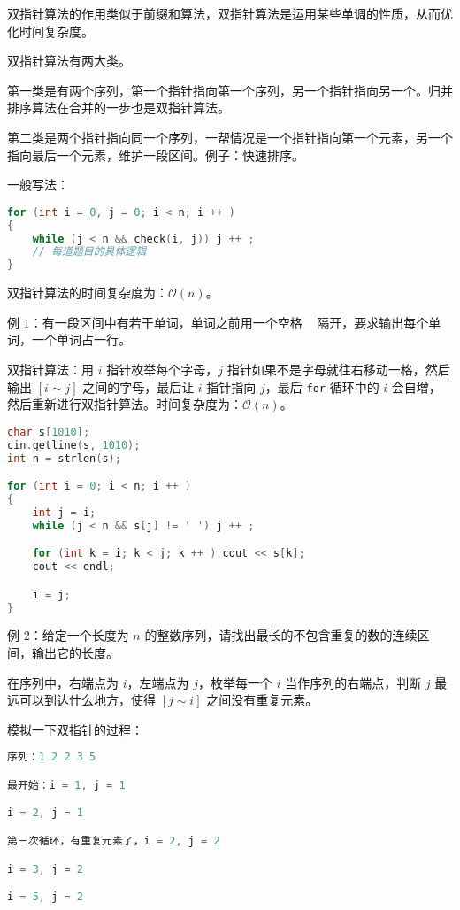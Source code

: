 
双指针算法的作用类似于前缀和算法，双指针算法是运用某些单调的性质，从而优化时间复杂度。

双指针算法有两大类。

第一类是有两个序列，第一个指针指向第一个序列，另一个指针指向另一个。归并排序算法在合并的一步也是双指针算法。

第二类是两个指针指向同一个序列，一帮情况是一个指针指向第一个元素，另一个指向最后一个元素，维护一段区间。例子：快速排序。

一般写法：

\begin{lstlisting}[language=cpp]
for (int i = 0, j = 0; i < n; i ++ )
{
    while (j < n && check(i, j)) j ++ ;
    // 每道题目的具体逻辑
}
\end{lstlisting}

双指针算法的时间复杂度为：$\mathcal{O}(n)$。

例 $1$：有一段区间中有若干单词，单词之前用一个空格 \verb| | 隔开，要求输出每个单词，一个单词占一行。

双指针算法：用 $i$ 指针枚举每个字母，$j$ 指针如果不是字母就往右移动一格，然后输出 $[i \sim j]$ 之间的字母，最后让 $i$ 指针指向 $j$，最后 \verb|for| 循环中的 $i$ 会自增，然后重新进行双指针算法。时间复杂度为：$\mathcal{O}(n)$。

\begin{lstlisting}[language=cpp]
char s[1010];
cin.getline(s, 1010);
int n = strlen(s);

for (int i = 0; i < n; i ++ )
{
    int j = i;
    while (j < n && s[j] != ' ') j ++ ;

    for (int k = i; k < j; k ++ ) cout << s[k];
    cout << endl;

    i = j;
}
\end{lstlisting}



例 $2$：给定一个长度为 $n$ 的整数序列，请找出最长的不包含重复的数的连续区间，输出它的长度。

在序列中，右端点为 $i$，左端点为 $j$，枚举每一个 $i$ 当作序列的右端点，判断 $j$ 最远可以到达什么地方，使得 $[j \sim i]$ 之间没有重复元素。

模拟一下双指针的过程：

\begin{lstlisting}[language=cpp]
序列：1 2 2 3 5

最开始：i = 1, j = 1

i = 2, j = 1

第三次循环，有重复元素了，i = 2, j = 2

i = 3, j = 2

i = 5, j = 2
\end{lstlisting}

